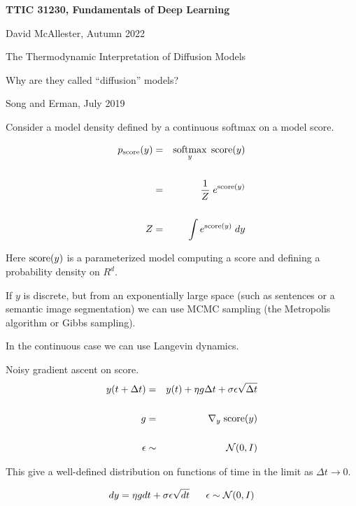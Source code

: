 





{\Huge

  \centerline{\bf TTIC 31230, Fundamentals of Deep Learning}
  \bigskip
  \centerline{David McAllester, Autumn 2022}
  \vfill
  \vfil
  \centerline{The Thermodynamic Interpretation of Diffusion Models}
  \vfill
  \centerline{Why are they called ``diffusion'' models?}
  \vfill
  \vfill

 
  {Song and Erman, July 2019}

Consider a model density defined by a continuous softmax on a model score.

\vfill
\begin{eqnarray*}
  p_{\mathrm{score}}(y) & = & \operatorname*{softmax}_y\; \mathrm{score}(y) \\
  \\
  & = & \frac{1}{Z} \;e^{\mathrm{score}(y)} \\
  \\
  Z & = & \int e^{\mathrm{score}(y)}\;dy
\end{eqnarray*}

\vfill
Here $\mathrm{score}(y)$ is a parameterized model computing a score and defining a probability density on $R^d$.


If $y$ is discrete, but from an exponentially large space (such as sentences or a semantic image segmentation) we can use MCMC sampling
(the Metropolis algorithm or Gibbs sampling).

\vfill
In the continuous case we can use Langevin dynamics.


Noisy gradient ascent on score.
\begin{eqnarray*}
  y(t+ \Delta t) & = & y(t) + \eta g \Delta t +  \sigma \epsilon \sqrt{\Delta t} \\
\\
g & = & \nabla_y\;\mathrm{score}(y) \\
\\
\epsilon & \sim & {\cal N}(0,I)
\end{eqnarray*}

\vfill
This give a well-defined distribution on functions of time in the limit as $\Delta t \rightarrow 0$.

{\color{red} $$dy =  \eta g dt + \sigma \epsilon \sqrt{dt}\;\;\;\;\;\; \epsilon \sim {\cal N}(0,I)$$}

}

